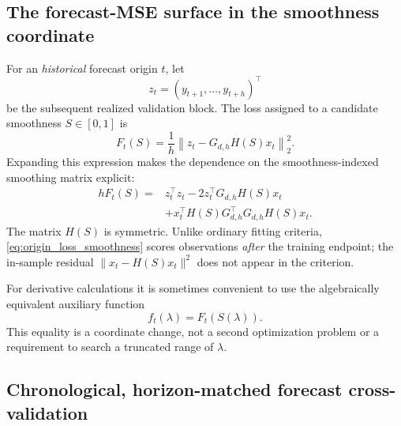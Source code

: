\subsection{The forecast-MSE surface in the smoothness coordinate}

For an \emph{historical} forecast origin $t$, let
\begin{equation}
\label{eq:future_observation_block}
z_t=(y_{t+1},\ldots,y_{t+h})^\top
\end{equation}
be the subsequent realized validation block. The loss assigned
to a candidate smoothness $S\in[0,1]$ is
\begin{equation}
\label{eq:origin_loss_smoothness}
F_t(S)
=\frac1h\left\|z_t-G_{d,h}H(S)x_t\right\|_2^2.
\end{equation}
Expanding this expression makes the dependence on the
smoothness-indexed smoothing matrix explicit:
\begin{equation}
\label{eq:origin_loss_quadratic}
\begin{aligned}
h F_t(S)
={}&z_t^\top z_t
-2z_t^\top G_{d,h}H(S)x_t\\
&+x_t^\top H(S)G_{d,h}^\top
G_{d,h}H(S)x_t.
\end{aligned}
\end{equation}
The matrix $H(S)$ is symmetric. Unlike ordinary fitting
criteria, \cref{eq:origin_loss_smoothness} scores observations
\emph{after} the training endpoint; the in-sample residual
$\|x_t-H(S)x_t\|^2$ does not appear in the criterion.

For derivative calculations it is sometimes convenient to
use the algebraically equivalent auxiliary function
\begin{equation}
\label{eq:origin_loss}
f_t(\lambda)=F_t(S(\lambda)).
\end{equation}
This equality is a coordinate change, not a second
optimization problem or a requirement to search a truncated
range of $\lambda$.

\subsection{Chronological, horizon-matched forecast cross-validation}

